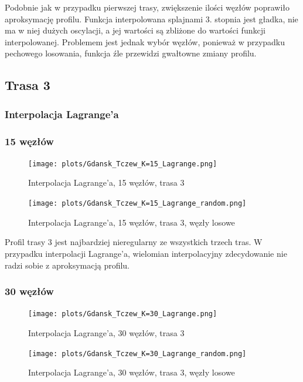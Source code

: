 \documentclass{article}
\begin{document}
Podobnie jak w przypadku pierwszej trasy, zwiększenie ilości węzłów poprawiło aproksymację profilu.
Funkcja interpolowana splajnami 3. stopnia jest gładka, nie ma w niej dużych oscylacji,
a jej wartości są zbliżone do wartości funkcji interpolowanej. Problemem jest jednak
wybór węzłów, ponieważ w przypadku pechowego losowania, funkcja źle przewidzi gwałtowne zmiany profilu.

\subsection{Trasa 3}

\subsubsection{Interpolacja Lagrange'a}

\subsubsection*{\hfil 15 węzłów \hfil }

\begin{figure}[H]
    \centering
    \texttt{[image: plots/Gdansk\_Tczew\_K=15\_Lagrange.png]}
    \caption{Interpolacja Lagrange'a, 15 węzłów, trasa 3}
\end{figure}

\begin{figure}[H]
    \centering
    \texttt{[image: plots/Gdansk\_Tczew\_K=15\_Lagrange\_random.png]}
    \caption{Interpolacja Lagrange'a, 15 węzłów, trasa 3, węzły losowe}
\end{figure}

Profil trasy 3 jest najbardziej nieregularny ze wszystkich trzech tras. W przypadku interpolacji
Lagrange'a, wielomian interpolacyjny zdecydowanie nie radzi sobie z aproksymacją profilu.

\subsubsection*{\hfil 30 węzłów \hfil }

\begin{figure}[H]
    \centering
    \texttt{[image: plots/Gdansk\_Tczew\_K=30\_Lagrange.png]}
    \caption{Interpolacja Lagrange'a, 30 węzłów, trasa 3}
\end{figure}

\begin{figure}[H]
    \centering
    \texttt{[image: plots/Gdansk\_Tczew\_K=30\_Lagrange\_random.png]}
    \caption{Interpolacja Lagrange'a, 30 węzłów, trasa 3, węzły losowe}
\end{figure}
\end{document}
